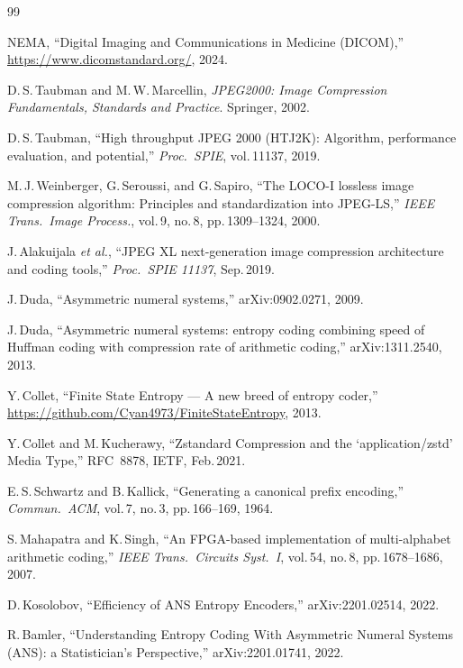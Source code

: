 \documentclass[journal]{IEEEtran}
\begin{document}
\begin{thebibliography}{99}

NEMA, ``Digital Imaging and Communications in Medicine (DICOM),''
\url{https://www.dicomstandard.org/}, 2024.

D.\,S.\,Taubman and M.\,W.\,Marcellin,
\textit{JPEG2000: Image Compression Fundamentals, Standards and Practice}.
Springer, 2002.

D.\,S.\,Taubman, ``High throughput JPEG 2000 (HTJ2K): Algorithm, performance
evaluation, and potential,'' \textit{Proc.\ SPIE}, vol.\,11137, 2019.

M.\,J.\,Weinberger, G.\,Seroussi, and G.\,Sapiro,
``The LOCO-I lossless image compression algorithm: Principles and
standardization into JPEG-LS,''
\textit{IEEE Trans.\ Image Process.}, vol.\,9, no.\,8, pp.\,1309--1324, 2000.

J.\,Alakuijala \textit{et al.},
``JPEG XL next-generation image compression architecture and coding tools,''
\textit{Proc.\ SPIE 11137}, Sep.\,2019.

J.\,Duda, ``Asymmetric numeral systems,'' arXiv:0902.0271, 2009.

J.\,Duda, ``Asymmetric numeral systems: entropy coding combining speed of
Huffman coding with compression rate of arithmetic coding,''
arXiv:1311.2540, 2013.

Y.\,Collet, ``Finite State Entropy --- A new breed of entropy coder,''
\url{https://github.com/Cyan4973/FiniteStateEntropy}, 2013.

Y.\,Collet and M.\,Kucherawy,
``Zstandard Compression and the `application/zstd' Media Type,''
RFC~8878, IETF, Feb.\,2021.

E.\,S.\,Schwartz and B.\,Kallick,
``Generating a canonical prefix encoding,''
\textit{Commun.\ ACM}, vol.\,7, no.\,3, pp.\,166--169, 1964.

S.\,Mahapatra and K.\,Singh,
``An FPGA-based implementation of multi-alphabet arithmetic coding,''
\textit{IEEE Trans.\ Circuits Syst.\ I}, vol.\,54, no.\,8, pp.\,1678--1686, 2007.

D.\,Kosolobov, ``Efficiency of ANS Entropy Encoders,''
arXiv:2201.02514, 2022.

R.\,Bamler, ``Understanding Entropy Coding With Asymmetric Numeral Systems
(ANS): a Statistician's Perspective,'' arXiv:2201.01741, 2022.


\end{thebibliography}
\end{document}
